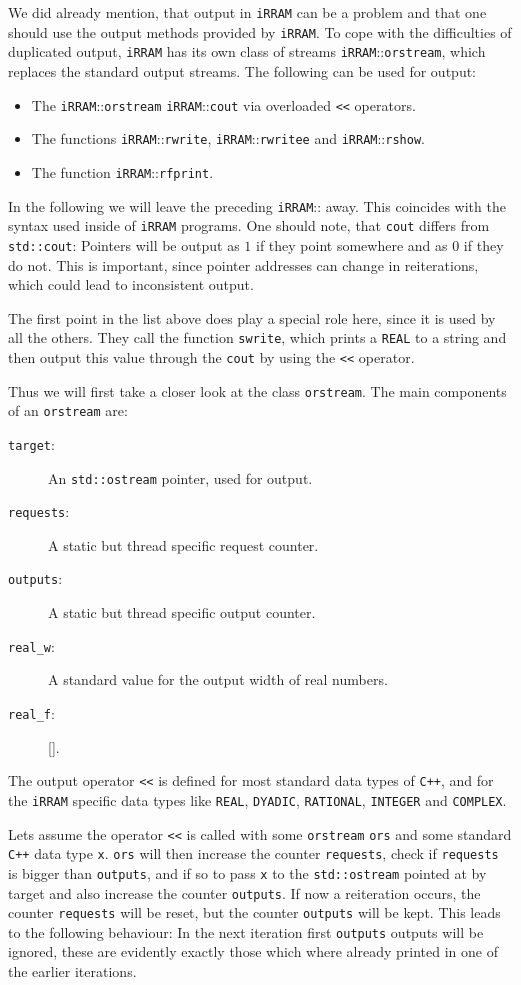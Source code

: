 \documentclass{article}
\newcommand{\irram}{\texttt{iRRAM}\xspace}
\newcommand{\cc}{\texttt{C++}\xspace}
\newcommand{\ir}[1]{\texttt{#1}\xspace}
\newcommand{\code}[1]{\texttt{#1}\xspace}
\begin{document}
We did already mention, that output in \irram can be a problem and that one should use the output methods provided by \irram. To cope with the difficulties of duplicated output, \irram has its own class of streams \irram::\ir{orstream}, which replaces the standard output streams. The following can be used for output:
\begin{itemize}
\item The \irram::\ir{orstream} \irram::\ir{cout} via overloaded \ir{<<} operators.
\item The functions \irram::\ir{rwrite}, \irram::\ir{rwritee} and \irram::\ir{rshow}.
\item The function \irram::\ir{rfprint}.
\end{itemize}
In the following we will leave the preceding \irram:: away. This coincides with the syntax used inside of \irram programs. One should note, that \ir{cout} differs from \texttt{std::cout}: Pointers will be output as $1$ if they point somewhere and as $0$ if they do not. This is important, since pointer addresses can change in reiterations, which could lead to inconsistent output.

The first point in the list above does play a special role here, since it is used by all the others. They call the function \ir{swrite}, which prints a \ir{REAL} to a string and then output this value through the \ir{cout} by using the \ir{<<} operator.

Thus we will first take a closer look at the class \ir{orstream}. The main components of an \ir{orstream} are:
\begin{description}
\item[\code{target}:] An \texttt{std::ostream} pointer, used for output.
\item[\code{requests}:] A static but thread specific request counter.
\item[\code{outputs}:] A static but thread specific output counter.
\item[\code{real\_w}:] A standard value for the output width of real numbers.
\item[\code{real\_f}:] \ref{}.
\end{description}
The output operator \code{<<} is defined for most standard data types of \cc, and for the \irram specific data types like \ir{REAL}, \ir{DYADIC}, \ir{RATIONAL}, \ir{INTEGER} and \ir{COMPLEX}.

Lets assume the operator \code{<<} is called with some \ir{orstream} \code{ors} and some standard \cc data type \code{x}. \code{ors} will then increase the counter \code{requests}, check if \code{requests} is bigger than \code{outputs}, and if so to pass \code{x} to the \ir{std::ostream} pointed at by target and also increase the counter \code{outputs}. If now a reiteration occurs, the counter \code{requests} will be reset, but the counter \code{outputs} will be kept. This leads to the following behaviour: In the next iteration first \code{outputs} outputs will be ignored, these are evidently exactly those which where already printed in one of the earlier iterations.
\end{document}
